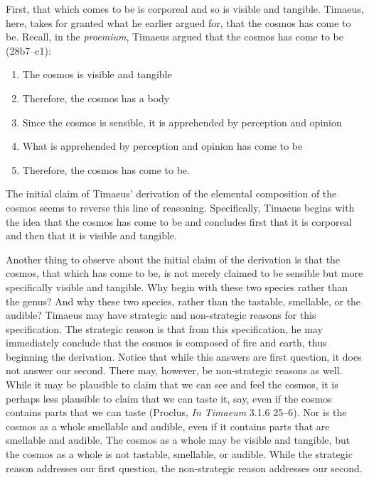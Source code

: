 First, that which comes to be is corporeal and so is visible and tangible. Timaeus, here, takes for granted what he earlier argued for, that the cosmos has come to be. Recall, in the \emph{proemium}, Timaeus argued that the cosmos has come to be (28b7--c1):
\begin{enumerate}
	\item The cosmos is visible and tangible
	\item Therefore, the cosmos has a body
	\item Since the cosmos is sensible, it is apprehended by perception and opinion
	\item What is apprehended by perception and opinion has come to be
	\item Therefore, the cosmos has come to be.
\end{enumerate}
The initial claim of Timaeus' derivation of the elemental composition of the cosmos seems to reverse this line of reasoning. Specifically, Timaeus begins with the idea that the cosmos has come to be and concludes first that it is corporeal and then that it is visible and tangible.

Another thing to observe about the initial claim of the derivation is that the cosmos, that which has come to be, is not merely claimed to be sensible but more specifically visible and tangible. Why begin with these two species rather than the genus? And why these two species, rather than the tastable, smellable, or the audible?  Timaeus may have strategic and non-strategic reasons for this specification. The strategic reason is that from this specification, he may immediately conclude that the cosmos is composed of fire and earth, thus beginning the derivation. Notice that while this answers are first question, it does not answer our second. There may, however, be non-strategic reasons as well. While it may be plausible to claim that we can see and feel the cosmos, it is perhaps less plausible to claim that we can taste it, say, even if the cosmos contains parts that we can taste (Proclus, \emph{In Timaeum} 3.1.6 25--6). Nor is the cosmos as a whole smellable and audible, even if it contains parts that are smellable and audible. The cosmos as a whole may be visible and tangible, but the cosmos as a whole is not tastable, smellable, or audible. While the strategic reason addresses our first question, the non-strategic reason addresses our second.

